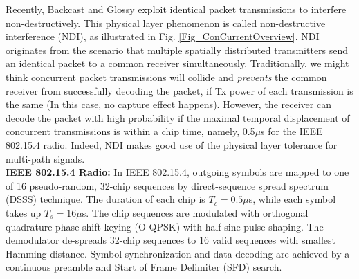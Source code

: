 \documentclass[conference]{IEEEtran}
\begin{document}
\indent Recently, Backcast \cite{DuttaSensys10Backcast} and Glossy \cite{ferrari11Glossy} exploit identical packet transmissions to interfere non-destructively.
This physical layer phenomenon is called non-destructive interference (NDI), as illustrated in Fig. \ref{Fig_ConCurrentOverview}.
NDI originates from the scenario that multiple spatially distributed transmitters send an identical packet to a common receiver simultaneously.
Traditionally, we might think concurrent packet transmissions will collide and \emph{prevents} the common receiver from successfully decoding the packet, if Tx power of each transmission is the same (In this case, no capture effect happens).
However, the receiver can decode the packet with high probability if the maximal temporal displacement of concurrent transmissions is within a chip time, namely, 0.5$\mu$s for the IEEE 802.15.4 radio.
Indeed, NDI makes good use of the physical layer tolerance for multi-path signals.\\
\indent \textbf{IEEE 802.15.4 Radio:}
In IEEE 802.15.4, outgoing symbols are mapped to one of 16 pseudo-random, 32-chip sequences by direct-sequence spread spectrum (DSSS) technique.
The duration of each chip is $T_c=0.5\mu$s, while each symbol takes up $T_s=16\mu$s.
The chip sequences are modulated with orthogonal quadrature phase shift keying (O-QPSK) with half-sine pulse shaping.
The demodulator de-spreads 32-chip sequences to 16 valid sequences with smallest Hamming distance.
Symbol synchronization and data decoding are achieved by a continuous preamble and Start of Frame Delimiter (SFD) search.
\end{document}

